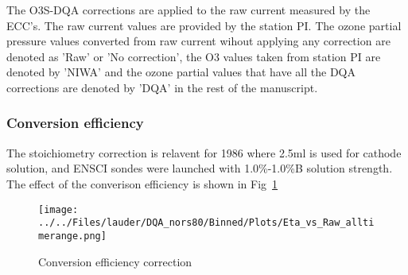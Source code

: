 The O3S-DQA corrections are applied to the raw current measured by the ECC's. The raw current values are provided by the station PI.
The ozone partial pressure values converted from raw current
wihout applying any correction are denoted as 'Raw' or 'No correction', the O3 values taken from station PI are denoted
by 'NIWA' and the ozone partial values that have all the DQA corrections
are denoted by 'DQA' in the rest of the manuscript.


    \subsubsection{Conversion efficiency}
 The stoichiometry correction is relavent for 1986 where 2.5ml is used for cathode solution, and ENSCI sondes were launched
    with 1.0\%-1.0\%B solution strength. The effect of the converison efficiency is shown in Fig~\ref{fig:eta}



                \begin{figure}
        \centering
\texttt{[image: ../../Files/lauder/DQA\_nors80/Binned/Plots/Eta\_vs\_Raw\_alltimerange.png]}
    \caption{Conversion efficiency correction}
            \label{fig:eta}
    \end{figure}

%
%
